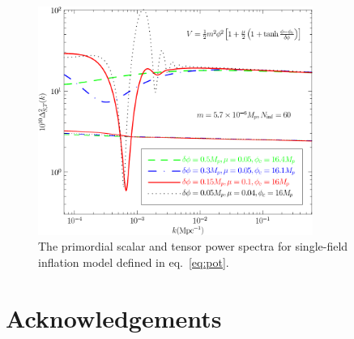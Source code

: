 \documentclass[11pt]{article}
\def \figwidth{0.8\textwidth}
\begin{document}
\begin{figure}
\includegraphics[width=\figwidth]{bumppower.pdf}
\caption{The primordial scalar and tensor power spectra for single-field inflation model defined in eq.~\eqref{eq:pot}. \label{fig:bumppower}}
\end{figure}

\section*{Acknowledgements}


  

\end{document}
